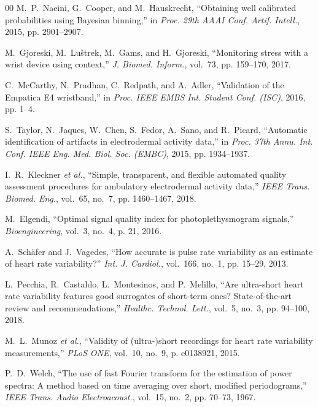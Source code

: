\documentclass[conference]{IEEEtran}
\begin{document}
\begin{thebibliography}{00}
M.~P.~Naeini, G.~Cooper, and M.~Hauskrecht, ``Obtaining well calibrated probabilities using Bayesian binning,'' in \textit{Proc. 29th AAAI Conf. Artif. Intell.}, 2015, pp. 2901--2907.

M.~Gjoreski, M.~Lu\v{s}trek, M.~Gams, and H.~Gjoreski, ``Monitoring stress with a wrist device using context,'' \textit{J. Biomed. Inform.}, vol.~73, pp. 159--170, 2017.

C.~McCarthy, N.~Pradhan, C.~Redpath, and A.~Adler, ``Validation of the Empatica E4 wristband,'' in \textit{Proc. IEEE EMBS Int. Student Conf. (ISC)}, 2016, pp. 1--4.

S.~Taylor, N.~Jaques, W.~Chen, S.~Fedor, A.~Sano, and R.~Picard, ``Automatic identification of artifacts in electrodermal activity data,'' in \textit{Proc. 37th Annu. Int. Conf. IEEE Eng. Med. Biol. Soc. (EMBC)}, 2015, pp. 1934--1937.

I.~R.~Kleckner \textit{et al.}, ``Simple, transparent, and flexible automated quality assessment procedures for ambulatory electrodermal activity data,'' \textit{IEEE Trans. Biomed. Eng.}, vol.~65, no.~7, pp. 1460--1467, 2018.

M.~Elgendi, ``Optimal signal quality index for photoplethysmogram signals,'' \textit{Bioengineering}, vol.~3, no.~4, p. 21, 2016.

A.~Sch{\"a}fer and J.~Vagedes, ``How accurate is pulse rate variability as an estimate of heart rate variability?'' \textit{Int. J. Cardiol.}, vol.~166, no.~1, pp. 15--29, 2013.

L.~Pecchia, R.~Castaldo, L.~Montesinos, and P.~Melillo, ``Are ultra-short heart rate variability features good surrogates of short-term ones? State-of-the-art review and recommendations,'' \textit{Healthc. Technol. Lett.}, vol.~5, no.~3, pp. 94--100, 2018.

M.~L.~Munoz \textit{et al.}, ``Validity of (ultra-)short recordings for heart rate variability measurements,'' \textit{PLoS ONE}, vol.~10, no.~9, p. e0138921, 2015.

P.~D.~Welch, ``The use of fast Fourier transform for the estimation of power spectra: A method based on time averaging over short, modified periodograms,'' \textit{IEEE Trans. Audio Electroacoust.}, vol.~15, no.~2, pp. 70--73, 1967.


\end{thebibliography}
\end{document}
